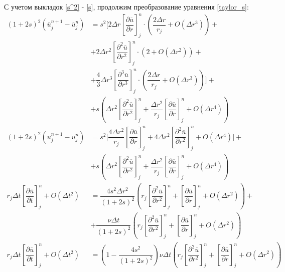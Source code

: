 С учетом выкладок \eqref{s^2} - \eqref{s}, продолжим преобразование уравнения \eqref{taylor_s}:
\begin{equation}
\begin{split}
	\left(1 + 2s\right)^2 \left( \overline{u}_j^{n+1} - \overline{u}_j^n \right) &= 
	s^2 \biggl[ 2 \Delta r \left[ \dfrac{\partial \overline{u}}{\partial r} \right]_j^n \cdot \left( \dfrac{2\Delta r}{r_j} + O(\Delta r^3) \right) + \\
	& + 2 \Delta r^2 \left[ \dfrac{\partial^2 \overline{u}}{\partial r^2} \right]_j^n \cdot \left( 2 + O(\Delta r^2) \right) + \\
	& + \dfrac{4}{3}\Delta r^3 \left[ \dfrac{\partial^3 \overline{u}}{\partial r^3} \right]_j^n \cdot \left( \dfrac{2 \Delta r}{r_j}  + O(\Delta r^3) \right) \biggr] + \\
	&+ s\left( \Delta r^2 \left[ \dfrac{\partial^2 \overline{u}}{\partial r^2} \right]_j^n + \dfrac{\Delta r^2}{r_j} \left[ \dfrac{\partial \overline{u}}{\partial r} \right]_j^n + O(\Delta r^4) \right) \\
	\left(1 + 2s\right)^2 \left( \overline{u}_j^{n+1} - \overline{u}_j^n \right) &= s^2 \biggl[ \dfrac{4\Delta r^2}{r_j} \left[ \dfrac{\partial \overline{u}}{\partial r} \right]_j^n + 4\Delta r^2 \left[ \dfrac{\partial^2 \overline{u}}{\partial r^2} \right]_j^n + O(\Delta r^4) \biggr] + \\
	& + s \left( \Delta r^2 \left[ \dfrac{\partial^2 \overline{u}}{\partial r^2} \right]_j^n + \dfrac{\Delta r^2}{r_j} \left[ \dfrac{\partial \overline{u}}{\partial r} \right]_j^n + O(\Delta r^4) \right) \\
	r_j\Delta t \left[ \dfrac{\partial \overline{u}}{\partial t} \right]_j^n + O(\Delta t^2) &= \dfrac{4s^2 \Delta r^2}{(1+2s)^2} 
	\left( r_j \left[ \dfrac{\partial^2 \overline{u}}{\partial r^2} \right]_j^n + \left[ \dfrac{\partial \overline{u}}{\partial r} \right]_j^n + O(\Delta r^2) \right) + \\
	&+ \dfrac{\nu \Delta t}{(1+2s)^2} \left(  r_j \left[ \dfrac{\partial^2 \overline{u}}{\partial r^2} \right]_j^n + \left[ \dfrac{\partial \overline{u}}{\partial r} \right]_j^n + O(\Delta r^2) \right) \\
	r_j\Delta t \left[ \dfrac{\partial \overline{u}}{\partial t} \right]_j^n + O(\Delta t^2) &= \left( 1 - \dfrac{4s^2}{(1+2s)^2} \right) \nu \Delta t \left( r_j \left[ \dfrac{\partial^2 \overline{u}}{\partial r^2} \right]_j^n + \left[ \dfrac{\partial \overline{u}}{\partial r} \right]_j^n + O(\Delta r^2) \right)
\end{split}
\end{equation}

